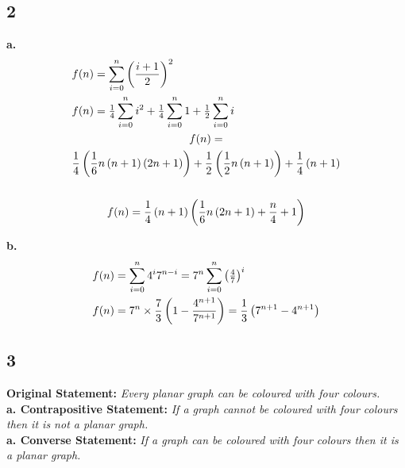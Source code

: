 \documentclass[10pt, twocolumn]{article}
\begin{document}
\subsection*{2}
\textbf{a.\\[-0.25cm]}
\begin{multline*}
f(n) = \sum\limits_{i = 0}^n {{{\left( {\frac{{i + 1}}{2}} \right)}^2}}\hfill\\
f(n) = \tfrac{1}{4}\sum\limits_{i = 0}^n {{i^2}}  + \tfrac{1}{4}\sum\limits_{i = 0}^n 1  + \tfrac{1}{2}\sum\limits_{i = 0}^n i\hfill\\
f(n) = \\\frac{1}{4}\left( {\frac{1}{6}n\left( {n + 1} \right)\left( {2n + 1} \right)} \right) + \frac{1}{2}\left( {\frac{1}{2}n\left( {n + 1} \right)} \right) + \frac{1}{4}\left( {n + 1} \right)\\\\
f(n) = \frac{1}{4}\left( {n + 1} \right)\left( {\frac{1}{6}n\left( {2n + 1} \right) + \frac{n}{4} + 1} \right)
\end{multline*}

\textbf{b.\\[-0.25cm]}
\begin{multline*}
f(n) = \sum\limits_{i = 0}^n {{4^i}{7^{n - i}}}={7^n}\sum\limits_{i = 0}^n {{{\left( {\tfrac{4}{7}} \right)}^i}}\hfill\\
f(n) = {7^n} \times \frac{7}{3}\left( {1 - \frac{{{4^{n + 1}}}}{{{7^{n + 1}}}}} \right) = \frac{1}{3}\left( {{7^{n + 1}} - {4^{n + 1}}} \right)\hfill\\
\end{multline*}

\subsection*{3}
\textbf{Original Statement:} \textit{Every planar graph can be coloured with four colours.}\\

\textbf{a. Contrapositive Statement:} \textit{If a graph cannot be coloured with four colours then it is not a planar graph.}\\

\textbf{a. Converse Statement:} \textit{If a graph can be coloured with four colours then it is a planar graph.}\\
\end{document}
